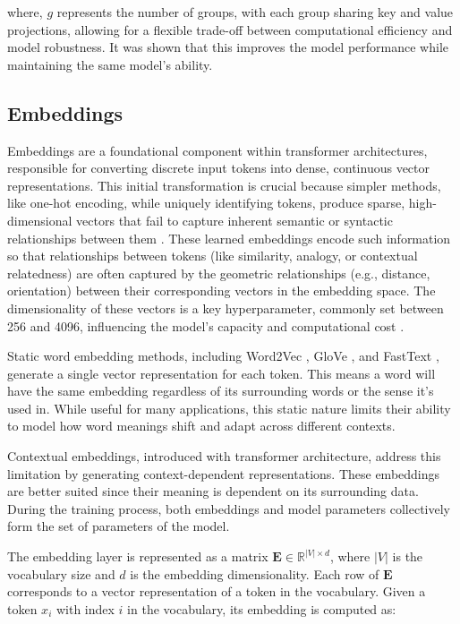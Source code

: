 where, $g$ represents the number of groups, with each group sharing key and value projections, allowing for a flexible trade-off between computational efficiency and model robustness. It was shown that this improves the model performance while maintaining the same model's ability.



\subsection{Embeddings}
Embeddings are a foundational component within transformer architectures, responsible for converting discrete input tokens into dense, continuous vector representations. This initial transformation is crucial because simpler methods, like one-hot encoding, while uniquely identifying tokens, produce sparse, high-dimensional vectors that fail to capture inherent semantic or syntactic relationships between them \cite{42543}. These learned embeddings encode such information so that relationships between tokens (like similarity, analogy, or contextual relatedness) are often captured by the geometric relationships (e.g., distance, orientation) between their corresponding vectors in the embedding space. The dimensionality of these vectors is a key hyperparameter, commonly set between 256 and 4096, influencing the model's capacity and computational cost \cite{bai2023qwen, touvron2023llama}. 


Static word embedding methods, including Word2Vec \cite{word2vec}, GloVe \cite{pennington-etal-2014-glove}, and FastText \cite{fasttext}, generate a single vector representation for each token. This means a word will have the same embedding regardless of its surrounding words or the sense it's used in. While useful for many applications, this static nature limits their ability to model how word meanings shift and adapt across different contexts.


Contextual embeddings, introduced with transformer architecture, address this limitation by generating context-dependent representations. These embeddings are better suited since their meaning is dependent on its surrounding data. During the training process, both embeddings and model parameters collectively form the set of parameters of the model.

The embedding layer is represented as a matrix $\mathbf{E} \in \mathbb{R}^{|V| \times d}$, where $|V|$ is the vocabulary size and $d$ is the embedding dimensionality. Each row of $\mathbf{E}$ corresponds to a vector representation of a token in the vocabulary.
Given a token $x_i$ with index $i$ in the vocabulary, its embedding is computed as:

